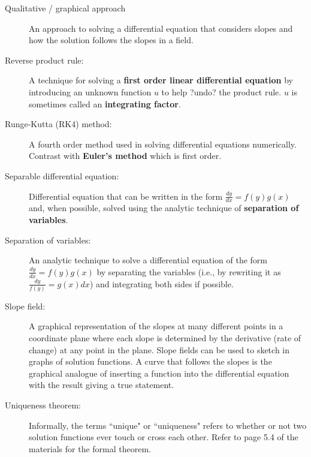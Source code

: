 \begin{description}
\item[Qualitative / graphical approach] An approach to solving a differential equation that considers slopes and how the solution follows the slopes in a field.
\item[Reverse product rule:] A technique for solving a \textbf{first order linear differential equation} by introducing an unknown function $u$ to help ?undo? the product rule. $u$ is sometimes called an \textbf{integrating factor}.
\item[Runge-Kutta (RK4) method:] A fourth order method used in solving differential equations numerically. Contrast with \textbf{Euler's method} which is first order.
\item[Separable differential equation:] Differential equation that can be written in the form $\frac{dy}{dx}=f(y)g(x)$ and, when possible, solved using the analytic technique of \textbf{separation of variables}.
\item[Separation of variables:] An analytic technique to solve a differential equation of the form $\frac{dy}{dx}=f(y)g(x)$ by separating the variables (i.e., by rewriting it as $\frac{dy}{f(y)}=g(x)dx$) and integrating both sides if possible.
\item[Slope field:] A graphical representation of the slopes at many different points in a coordinate plane where each slope is determined by the derivative (rate of change) at any point in the plane. Slope fields can be used to sketch in graphs of solution functions. A curve that follows the slopes is the graphical analogue of inserting a function into the differential equation with the result giving a true statement.
\item[Uniqueness theorem:] Informally, the terms ``unique" or ``uniqueness" refers to whether or not two solution functions ever touch or cross each other. Refer to page 5.4 of the materials for the formal theorem.

\end{description}

\clearpage

